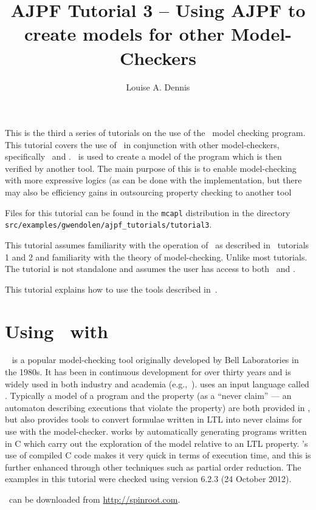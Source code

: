 \documentclass[a4]{article}
\author{Louise A. Dennis}
\title{AJPF Tutorial 3 -- Using AJPF to create models for other Model-Checkers}
\begin{document}
\maketitle
This is the third a series of tutorials on the use of the \ajpf\ model checking program.  This tutorial covers the use of \ajpf\ in conjunction with other model-checkers, specifically \spin\ and \prism.  \ajpf\ is used to create a model of the program which is then verified by another tool.  The main purpose of this is to enable model-checking with more expressive logics (as can be done with the \prism\) implementation, but there may also be efficiency gains in outsourcing property checking to another tool

Files for this tutorial can be found in the \texttt{mcapl} distribution in the directory \texttt{src/examples/gwendolen/ajpf\_tutorials/tutorial3}.

This tutorial assumes familiarity with the operation of \ajpf\ as described in \ajpf\ tutorials 1 and 2 and familiarity with the theory of model-checking.  Unlike most tutorials.  The tutorial is not standalone and assumes the user has access to both \spin\ and \prism.

This tutorial explains how to use the tools described in~\cite{dennis15:two}.

\section{Using \ajpf\ with \spin}

\spin{}~\cite{holzmann04spin} is a popular model-checking tool
originally developed by Bell Laboratories in the 1980s.  It has been
in continuous development for over thirty years and is widely used in
both industry and academia
(e.g.,~\cite{havelund00formal,kars96application,kirsch11technical}).
\spin{} uses an input language called \promela{}.  Typically a model
of a program and the property (as a ``never claim'' --- an automaton
describing executions that violate the property) are both provided in
\promela{}, but \spin{} also provides tools to convert formulae
written in LTL into never claims for use with the
model-checker. \spin{} works by automatically generating programs
written in C which carry out the exploration of the model relative to
an LTL property. \spin{}'s use of compiled C code makes it very quick
in terms of execution time, and this is further enhanced through other
techniques such as partial order reduction. The examples in this tutorial were checked using \spin{} version 6.2.3 (24 October 2012).

\spin\ can be downloaded from \url{http://spinroot.com}.


\end{document}
